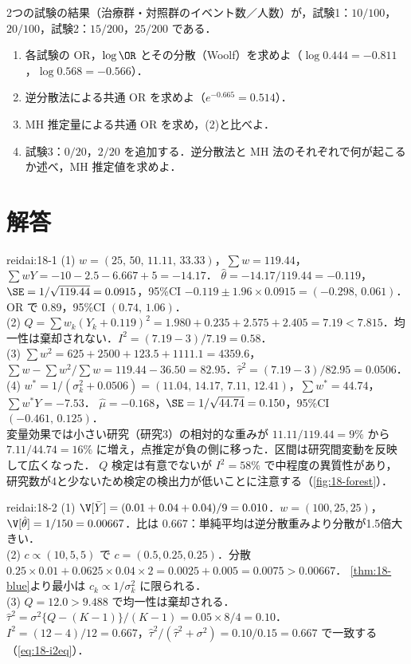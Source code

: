 \begin{reidai}[2×2 表の研究の統合]\label{reidai:18-3}
2つの試験の結果（治療群・対照群のイベント数／人数）が，試験1：$10/100$，$20/100$，試験2：$15/200$，$25/200$ である．
\begin{enumerate}[label=(\arabic*)]
\item 各試験の OR，$\log\OR$ とその分散（Woolf）を求めよ（$\log0.444=-0.811$，$\log0.568=-0.566$）．
\item 逆分散法による共通 OR を求めよ（$e^{-0.665}=0.514$）．
\item MH 推定量による共通 OR を求め，(2)と比べよ．
\item 試験3：$0/20$，$2/20$ を追加する．逆分散法と MH 法のそれぞれで何が起こるか述べ，MH 推定値を求めよ．
\end{enumerate}
\end{reidai}

\section{解答}\label{sec:18-sol}
\begin{kaitou}{reidai:18-1}
(1) $w=(25,\,50,\,11.11,\,33.33)$，$\sum w=119.44$，$\sum wY=-10-2.5-6.667+5=-14.17$．
$\hat\theta=-14.17/119.44=-0.119$，$\SE=1/\sqrt{119.44}=0.0915$，95\%CI $-0.119\pm1.96\times0.0915=(-0.298,\,0.061)$．OR で $0.89$，95\%CI $(0.74,\,1.06)$．\\
(2) $Q=\sum w_k(Y_k+0.119)^2=1.980+0.235+2.575+2.405=7.19<7.815$．均一性は棄却されない．$I^2=(7.19-3)/7.19=0.58$．\\
(3) $\sum w^2=625+2500+123.5+1111.1=4359.6$，$\sum w-\sum w^2/\sum w=119.44-36.50=82.95$．$\hat\tau^2=(7.19-3)/82.95=0.0506$．\\
(4) $w^*=1/(\sigma_k^2+0.0506)=(11.04,\,14.17,\,7.11,\,12.41)$，$\sum w^*=44.74$，$\sum w^*Y=-7.53$．
$\hat\mu=-0.168$，$\SE=1/\sqrt{44.74}=0.150$，95\%CI $(-0.461,\,0.125)$．\\
変量効果では小さい研究（研究3）の相対的な重みが $11.11/119.44=9\%$ から $7.11/44.74=16\%$ に増え，点推定が負の側に移った．区間は研究間変動を反映して広くなった．
$Q$ 検定は有意でないが $I^2=58\%$ で中程度の異質性があり，研究数が4と少ないため検定の検出力が低いことに注意する（\cref{fig:18-forest}）．
\end{kaitou}

\begin{kaitou}{reidai:18-2}
(1) $\V[\bar Y]=(0.01+0.04+0.04)/9=0.010$．$w=(100,25,25)$，$\V[\hat\theta]=1/150=0.00667$．比は $0.667$：単純平均は逆分散重みより分散が1.5倍大きい．\\
(2) $c\propto(10,5,5)$ で $c=(0.5,0.25,0.25)$．分散 $0.25\times0.01+0.0625\times0.04\times2=0.0025+0.005=0.0075>0.00667$．
\cref{thm:18-blue}より最小は $c_k\propto1/\sigma_k^2$ に限られる．\\
(3) $Q=12.0>9.488$ で均一性は棄却される．$\hat\tau^2=\sigma^2\{Q-(K-1)\}/(K-1)=0.05\times8/4=0.10$．
$I^2=(12-4)/12=0.667$，$\hat\tau^2/(\hat\tau^2+\sigma^2)=0.10/0.15=0.667$ で一致する（\cref{eq:18-i2eq}）．
\end{kaitou}

